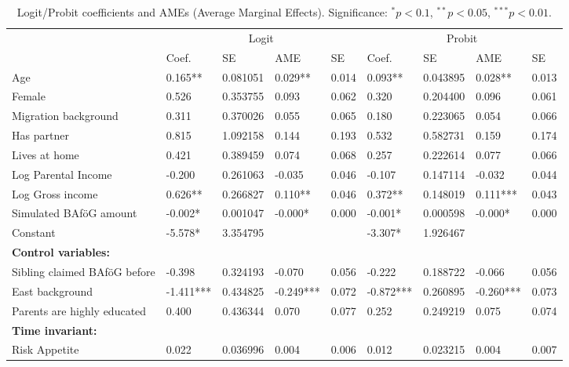 \begin{table}
\renewcommand{\arraystretch}{1.25}
\footnotesize
\label{tab:logit-probit-ame}
\begin{tabular}{lllllllll}
\toprule
 & \multicolumn{4}{c}{Logit} & \multicolumn{4}{c}{Probit} \\ 
\cmidrule(lr){2-5} \cmidrule(lr){6-9}
 & Coef. & SE & AME & SE & Coef. & SE & AME & SE \\
 \midrule
Age                           & 0.165**     & 0.081051 & 0.029** & 0.014 & 0.093** & 0.043895 & 0.028** & 0.013 \\
Female                        & 0.526       & 0.353755 & 0.093 & 0.062 & 0.320 & 0.204400 & 0.096 & 0.061 \\
Migration background          & 0.311       & 0.370026 & 0.055 & 0.065 & 0.180 & 0.223065 & 0.054 & 0.066 \\
Has partner                   & 0.815       & 1.092158 & 0.144 & 0.193 & 0.532 & 0.582731 & 0.159 & 0.174 \\
Lives at home                 & 0.421       & 0.389459 & 0.074 & 0.068 & 0.257 & 0.222614 & 0.077 & 0.066 \\
Log Parental Income           & -0.200      & 0.261063 & -0.035 & 0.046 & -0.107 & 0.147114 & -0.032 & 0.044 \\
Log Gross income              & 0.626**     & 0.266827 & 0.110** & 0.046 & 0.372** & 0.148019 & 0.111*** & 0.043 \\
Simulated BAföG amount        & -0.002*     & 0.001047 & -0.000* & 0.000 & -0.001* & 0.000598 & -0.000* & 0.000 \\
Constant                      & -5.578*     & 3.354795 &  &  & -3.307* & 1.926467 &  &  \\
\midrule
\multicolumn{9}{l}{\textbf{Control variables:}} \\
Sibling claimed BAföG before  & -0.398      & 0.324193 & -0.070 & 0.056 & -0.222 & 0.188722 & -0.066 & 0.056 \\
East background               & -1.411***   & 0.434825 & -0.249*** & 0.072 & -0.872*** & 0.260895 & -0.260*** & 0.073 \\
Parents are highly educated   & 0.400       & 0.436344 & 0.070 & 0.077 & 0.252 & 0.249219 & 0.075 & 0.074 \\
\midrule
\multicolumn{9}{l}{\textbf{Time invariant:}} \\
Risk Appetite                 & 0.022       & 0.036996 & 0.004 & 0.006 & 0.012 & 0.023215 & 0.004 & 0.007 \\
\bottomrule
\end{tabular}
\caption{Logit/Probit coefficients and AMEs (Average Marginal Effects). Significance: $^{*} p < 0.1$, $^{**} p < 0.05$, $^{***} p < 0.01$.}
\end{table}


